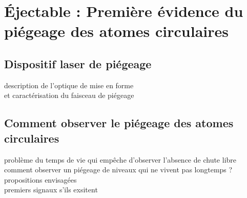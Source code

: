 
\section{Éjectable : Première évidence du piégeage des atomes circulaires}
	\subsection{Dispositif laser de piégeage}
		\noindent description de l'optique de mise en forme \\
		et caractérisation du faisceau de piégeage
	\subsection{Comment observer le piégeage des atomes circulaires}
		\noindent problème du temps de vie qui empêche d'observer l'absence de chute libre \\
		\noindent comment observer un piégeage de niveaux qui ne vivent pas longtemps ? propositions envisagées\\
		premiers signaux s'ils exsitent
